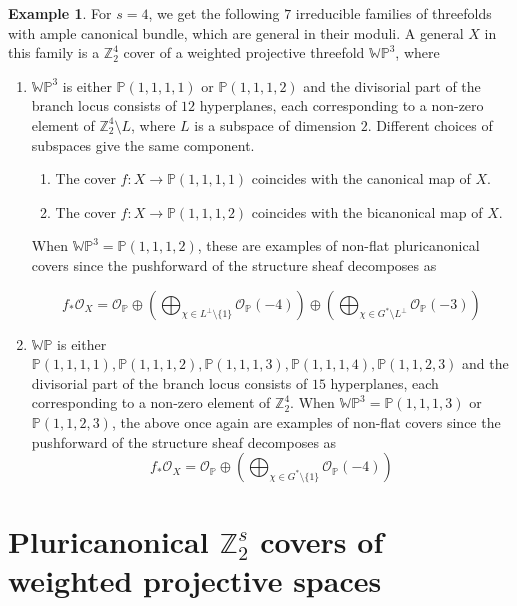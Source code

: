 \documentclass[12pt,twoside,]{amsart}
\theoremstyle{plain}
\theoremstyle{definition}
\newtheorem{example}[theorem]{Example}
\begin{document}
\begin{example}
For $s = 4$, we get the following $7$ irreducible families of threefolds with ample canonical bundle, which are general in their moduli. A general $X$ in this family is a $\mathbb{Z}_2^4$ cover of a weighted projective threefold $\mathbb{WP}^3$, where
    \begin{enumerate}
        \item $\mathbb{WP}^3$ is either $\mathbb{P}(1,1,1,1)$ or $ \mathbb{P}(1,1,1,2)$ and the divisorial part of the branch locus consists of $12$ hyperplanes, each corresponding to a non-zero element of $\mathbb{Z}_2^4 \setminus L$, where $L$ is a subspace of dimension $2$. Different choices of subspaces give the same component. 
        \begin{enumerate}
            \item The cover $f: X \to \mathbb{P}(1,1,1,1)$ coincides with the canonical map of $X$.
            \item The cover $f: X \to \mathbb{P}(1,1,1,2)$ coincides with the bicanonical map of $X$.
        \end{enumerate}
        When $\mathbb{WP}^3 = \mathbb{P}(1,1,1,2)$, these are examples of non-flat pluricanonical covers since the pushforward of the structure sheaf decomposes as 
        
        \[f_*\mathcal{O}_X = \mathcal{O}_{\mathbb{P}} \oplus\left(\bigoplus_{\chi \in L^{\perp} \setminus \{1\}} \mathcal{O}_{\mathbb{P}}(-4)\right) \oplus \left( \bigoplus_{\chi \in G^* \setminus L^{\perp}} \mathcal{O}_{\mathbb{P}}(-3) \right)\]
        
        \item $\mathbb{WP}$ is either $\mathbb{P}(1,1,1,1), \mathbb{P}(1,1,1,2), \mathbb{P}(1,1,1,3), \mathbb{P}(1,1,1,4), \mathbb{P}(1,1,2,3)$ and the divisorial part of the branch locus consists of $15$ hyperplanes, each corresponding to a non-zero element of $\mathbb{Z}_2^4$.
        When $\mathbb{WP}^3 = \mathbb{P}(1,1,1,3)$ or $\mathbb{P}(1,1,2,3)$, the above once again are examples of non-flat covers since the pushforward of the structure sheaf decomposes as 
        \[
        f_*\mathcal{O}_X = \mathcal{O}_{\mathbb{P}} \oplus\left(\bigoplus_{\chi \in G^* \setminus \{1\}} \mathcal{O}_{\mathbb{P}}(-4)\right)
        \]
    \end{enumerate}

\end{example}




\section{Pluricanonical $\mathbb{Z}_2^s$ covers of weighted projective spaces}\label{sec:pluricanonical}
\end{document}
